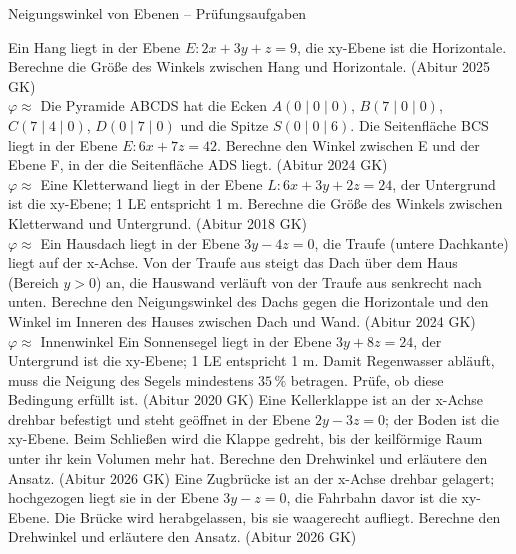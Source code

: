 \begin{aufgabe}{Neigungswinkel von Ebenen – Prüfungsaufgaben}
\begin{teile}
\teil Ein Hang liegt in der Ebene $E\colon 2x + 3y + z = 9$, die xy-Ebene ist die Horizontale. Berechne die Größe des Winkels zwischen Hang und Horizontale. \hfill (Abitur 2025 GK) \\ $\varphi \approx$ \leerfeld[$^\circ$]
\teil Die Pyramide ABCDS hat die Ecken $A(0 \mid 0 \mid 0)$, $B(7 \mid 0 \mid 0)$, $C(7 \mid 4 \mid 0)$, $D(0 \mid 7 \mid 0)$ und die Spitze $S(0 \mid 0 \mid 6)$. Die Seitenfläche BCS liegt in der Ebene $E\colon 6x + 7z = 42$. Berechne den Winkel zwischen E und der Ebene F, in der die Seitenfläche ADS liegt. \hfill (Abitur 2024 GK) \\ $\varphi \approx$ \leerfeld[$^\circ$]
\teil Eine Kletterwand liegt in der Ebene $L\colon 6x + 3y + 2z = 24$, der Untergrund ist die xy-Ebene; 1 LE entspricht 1 m. Berechne die Größe des Winkels zwischen Kletterwand und Untergrund. \hfill (Abitur 2018 GK) \\ $\varphi \approx$ \leerfeld[$^\circ$]
\teil Ein Hausdach liegt in der Ebene $3y - 4z = 0$, die Traufe (untere Dachkante) liegt auf der x-Achse. Von der Traufe aus steigt das Dach über dem Haus (Bereich $y > 0$) an, die Hauswand verläuft von der Traufe aus senkrecht nach unten. Berechne den Neigungswinkel des Dachs gegen die Horizontale und den Winkel im Inneren des Hauses zwischen Dach und Wand. \hfill (Abitur 2024 GK) \\ $\varphi \approx$ \leerfeld[$^\circ$] \quad Innenwinkel \leerfeld[$^\circ$]
\teil Ein Sonnensegel liegt in der Ebene $3y + 8z = 24$, der Untergrund ist die xy-Ebene; 1 LE entspricht 1 m. Damit Regenwasser abläuft, muss die Neigung des Segels mindestens $35\,\%$ betragen. Prüfe, ob diese Bedingung erfüllt ist. \hfill (Abitur 2020 GK)
\teil Eine Kellerklappe ist an der x-Achse drehbar befestigt und steht geöffnet in der Ebene $2y - 3z = 0$; der Boden ist die xy-Ebene. Beim Schließen wird die Klappe gedreht, bis der keilförmige Raum unter ihr kein Volumen mehr hat. Berechne den Drehwinkel und erläutere den Ansatz. \hfill (Abitur 2026 GK)
\teil Eine Zugbrücke ist an der x-Achse drehbar gelagert; hochgezogen liegt sie in der Ebene $3y - z = 0$, die Fahrbahn davor ist die xy-Ebene. Die Brücke wird herabgelassen, bis sie waagerecht aufliegt. Berechne den Drehwinkel und erläutere den Ansatz. \hfill (Abitur 2026 GK)
\end{teile}
\end{aufgabe}

